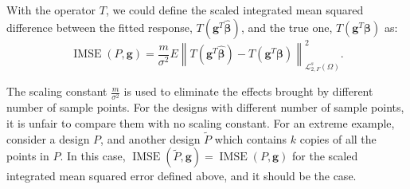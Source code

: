 \documentclass[preprint,12pt]{elsarticle}
\DeclareMathOperator{\IMSE}{IMSE}
\begin{document}
With the operator $T$, we could define the scaled integrated mean
squared difference between the fitted response,
$T\left(\boldsymbol{g}^T \hat{\boldsymbol{\beta}}\right)$, and the
true one, $T\left(\boldsymbol{g}^T \boldsymbol{\beta}\right)$ as:
$$\IMSE(P,\boldsymbol{g})=\frac{m}{\sigma^2}E\left\|T \left(\boldsymbol{g}^T
\hat{\boldsymbol{\beta}}\right)-T \left(\boldsymbol{g}^T
\boldsymbol{\beta}\right)\right\|_{\mathcal{L}_{2,F}^s(\Omega)}^2.$$

The scaling constant $\frac{m}{\sigma^2}$ is used to eliminate the
effects brought by different number of sample points. For the
designs with different number of sample points, it is unfair to
compare them with no scaling constant. For an extreme example,
consider a design $P$, and another design $\widetilde{P}$ which
contains $k$ copies of all the points in $P$. In this case,
$\IMSE(\widetilde{P},\boldsymbol{g})=\IMSE(P,\boldsymbol{g})$ for
the scaled integrated mean squared error defined above, and it
should be the case.
\end{document}

